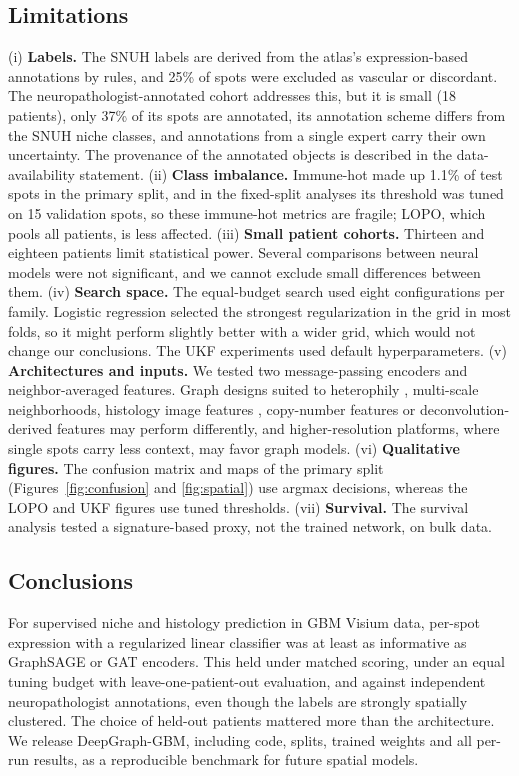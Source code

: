 \documentclass[11pt,letterpaper]{article}
\begin{document}
\subsection{Limitations}

(i) \textbf{Labels.} The SNUH labels are derived from the atlas's expression-based annotations by rules, and 25\% of spots were excluded as vascular or discordant. The neuropathologist-annotated cohort addresses this, but it is small (18 patients), only 37\% of its spots are annotated, its annotation scheme differs from the SNUH niche classes, and annotations from a single expert carry their own uncertainty. The provenance of the annotated objects is described in the data-availability statement. (ii) \textbf{Class imbalance.} Immune-hot made up 1.1\% of test spots in the primary split, and in the fixed-split analyses its threshold was tuned on 15 validation spots, so these immune-hot metrics are fragile; LOPO, which pools all patients, is less affected. (iii) \textbf{Small patient cohorts.} Thirteen and eighteen patients limit statistical power. Several comparisons between neural models were not significant, and we cannot exclude small differences between them. (iv) \textbf{Search space.} The equal-budget search used eight configurations per family. Logistic regression selected the strongest regularization in the grid in most folds, so it might perform slightly better with a wider grid, which would not change our conclusions. The UKF experiments used default hyperparameters. (v) \textbf{Architectures and inputs.} We tested two message-passing encoders and neighbor-averaged features. Graph designs suited to heterophily \cite{zhu2020homophily}, multi-scale neighborhoods, histology image features \cite{hu2021spagcn}, copy-number features \cite{ritter2025} or deconvolution-derived features \cite{kleshchevnikov2022} may perform differently, and higher-resolution platforms, where single spots carry less context, may favor graph models. (vi) \textbf{Qualitative figures.} The confusion matrix and maps of the primary split (Figures~\ref{fig:confusion} and \ref{fig:spatial}) use argmax decisions, whereas the LOPO and UKF figures use tuned thresholds. (vii) \textbf{Survival.} The survival analysis tested a signature-based proxy, not the trained network, on bulk data.

\subsection{Conclusions}

For supervised niche and histology prediction in GBM Visium data, per-spot expression with a regularized linear classifier was at least as informative as GraphSAGE or GAT encoders. This held under matched scoring, under an equal tuning budget with leave-one-patient-out evaluation, and against independent neuropathologist annotations, even though the labels are strongly spatially clustered. The choice of held-out patients mattered more than the architecture. We release DeepGraph-GBM, including code, splits, trained weights and all per-run results, as a reproducible benchmark for future spatial models.
\end{document}
